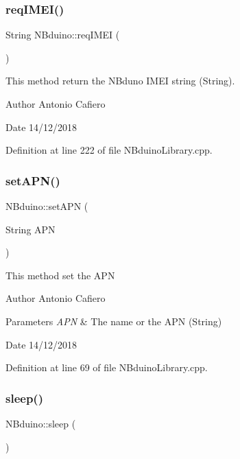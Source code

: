 \subsubsection{\texorpdfstring{req\+I\+M\+E\+I()}{reqIMEI()}}
{\footnotesize\ttfamily String N\+Bduino\+::req\+I\+M\+EI (\begin{DoxyParamCaption}{ }\end{DoxyParamCaption})}

This method return the N\+Bduno I\+M\+EI string (String). \begin{DoxyAuthor}{Author}
Antonio Cafiero 
\end{DoxyAuthor}
\begin{DoxyDate}{Date}
14/12/2018 
\end{DoxyDate}


Definition at line 222 of file N\+Bduino\+Library.\+cpp.

\mbox{\label{class_n_bduino_a9a903295305e847b3d68a7a6cc111316}} 
\subsubsection{\texorpdfstring{set\+A\+P\+N()}{setAPN()}}
{\footnotesize\ttfamily N\+Bduino\+::set\+A\+PN (\begin{DoxyParamCaption}\item[{String}]{A\+PN }\end{DoxyParamCaption})}

This method set the A\+PN \begin{DoxyAuthor}{Author}
Antonio Cafiero 
\end{DoxyAuthor}

\begin{DoxyParams}{Parameters}
{\em A\+PN} & The name or the A\+PN (String) \\
\hline
\end{DoxyParams}
\begin{DoxyDate}{Date}
14/12/2018 
\end{DoxyDate}


Definition at line 69 of file N\+Bduino\+Library.\+cpp.

\mbox{\label{class_n_bduino_ac7bf8f7f0552ad2cbda4b3e91a82bfca}} 
\subsubsection{\texorpdfstring{sleep()}{sleep()}}
{\footnotesize\ttfamily N\+Bduino\+::sleep (\begin{DoxyParamCaption}{ }\end{DoxyParamCaption})}

